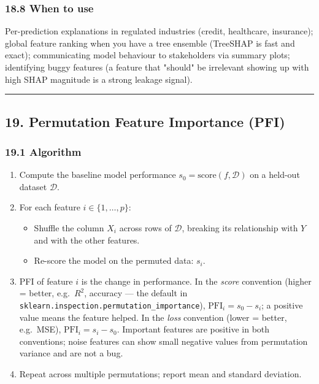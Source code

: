 \documentclass{article}
\providecommand{\tightlist}{\setlength{\itemsep}{0pt}\setlength{\parskip}{0pt}}
\begin{document}
\subsubsection{18.8 When to use}\label{188-when-to-use}

Per-prediction explanations in regulated industries (credit, healthcare,
insurance); global feature ranking when you have a tree ensemble
(TreeSHAP is fast and exact); communicating model behaviour to
stakeholders via summary plots; identifying buggy features (a feature
that "should" be irrelevant showing up with high SHAP magnitude is a
strong leakage signal).

\begin{center}\rule{0.5\linewidth}{0.5pt}\end{center}

\subsection{19. Permutation Feature Importance
(PFI)}\label{19-permutation-feature-importance-pfi}

\subsubsection{19.1 Algorithm}\label{191-algorithm}

\begin{enumerate}
\def\labelenumi{\arabic{enumi}.}
\tightlist
\item
  Compute the baseline model performance
  \(s_0 = \mathrm{score}(f, \mathcal{D})\) on a held-out dataset
  \(\mathcal{D}\).
\item
  For each feature \(i \in \{1, \dots, p\}\):

  \begin{itemize}
  \tightlist
  \item
    Shuffle the column \(X_i\) across rows of \(\mathcal{D}\), breaking
    its relationship with \(Y\) and with the other features.
  \item
    Re-score the model on the permuted data: \(s_i\).
  \end{itemize}
\item
  PFI of feature \(i\) is the change in performance. In the
  \emph{score} convention (higher = better, e.g.\ \(R^2\), accuracy ---
  the default in \texttt{sklearn.inspection.permutation\_importance}),
  \(\mathrm{PFI}_i = s_0 - s_i\); a positive value means the feature
  helped. In the \emph{loss} convention (lower = better, e.g.\ MSE),
  \(\mathrm{PFI}_i = s_i - s_0\). Important features are positive in
  both conventions; noise features can show small negative values from
  permutation variance and are not a bug.
\item
  Repeat across multiple permutations; report mean and standard
  deviation.
\end{enumerate}
\end{document}
